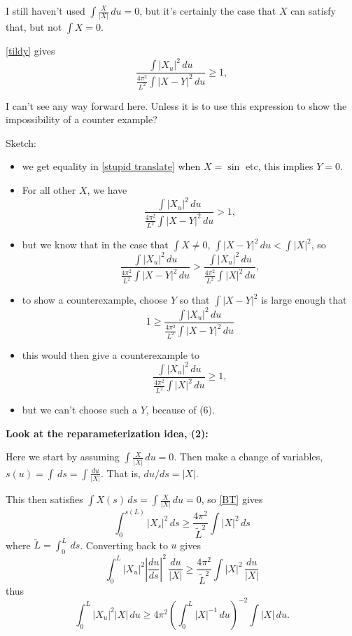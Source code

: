 \documentclass{amsart}
\begin{document}
I still haven't used $\int \frac{X}{|X|}\,du=0$, but it's certainly the case that $X$ can satisfy that, but not $\int X=0$.  

\eqref{tildy} gives 
\begin{equation}\frac{ \int |{X}_u|^2 \,du}{ \frac{4\pi^2}{L^2}\int |{X}-Y|^2\,du }\ge 1, \label{stupid translate} \end{equation}

I can't see any way forward here.   Unless it is to use this expression to show the impossibility of a counter example?

Sketch:   \begin{itemize}
\item we get equality in \eqref{stupid translate} when $X=\sin $ etc, this implies $Y=0$. 
\item For all other $X$, we have
\begin{equation}\frac{ \int |{X}_u|^2 \,du}{ \frac{4\pi^2}{L^2}\int |{X}-Y|^2\,du }> 1,  \end{equation}
\item but we know that in the case that $\int X\not=0$, $\int |{X}-Y|^2\,du < \int |X|^2$, so 
\begin{equation}
\frac{ \int |{X}_u|^2 \,du}{ \frac{4\pi^2}{L^2}\int |{X}-Y|^2\,du }> \frac{ \int |{X}_u|^2 \,du}{ \frac{4\pi^2}{L^2}\int |{X}|^2\,du },  \end{equation}
\item to show a counterexample, choose $Y$ so that $\int |X-Y|^2$ is large enough that 
\[1\ge \frac{ \int |{X}_u|^2 \,du}{ \frac{4\pi^2}{L^2}\int |{X}-Y|^2\,du }\]
\item this would then give a counterexample to 
\begin{equation}\frac{ \int |{X}_u|^2 \,du}{ \frac{4\pi^2}{L^2}\int |{X}|^2\,du }\ge 1, \label{stupid translate} \end{equation}
\item but we can't choose such a $Y$, because of (6).
\end{itemize}
\bigskip

\textbf{Look at the reparameterization idea, (2):}

Here we start by assuming  $\int \frac{X}{|X|}\,du=0$.  Then make a change of variables, $s(u)=\int \,ds=\int \frac{du}{|X|}$.   That is, $du/ds=|X|$.  

This then satisfies $\int X(s)\,ds=\int  \frac{X}{|X|}\,du=0$, so \eqref{BT} gives
\[ \int_0^{s(L)} |X_s|^2 \,ds \ge \frac{4\pi^2}{\tilde{L}^2}\int |X|^2\,ds\]
where $\tilde{L}=\int_0^L \,ds$.  Converting back to $u$ gives
\[ \int_0^{L} |X_u|^2|\frac{du}{ds}|^2 \,\frac{du}{|X|} \ge \frac{4\pi^2}{\tilde{L}^2}\int |X|^2\,\frac{du}{|X|}\]
thus
\[ \int_0^{L} |X_u|^2|X| \,du\ge {4\pi^2}\left(\int_0^L |X|^{-1}\,du \right)^{-2}\int |X|\,{du}.\]
\end{document}
